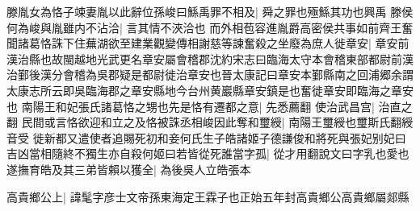 滕胤女為恪子竦妻胤以此辭位孫峻曰鯀禹罪不相及|{
	舜之罪也殛鯀其功也興禹}
滕侯何為峻與胤雖内不沾洽|{
	言其情不浹洽也}
而外相苞容進胤爵高密侯共事如前齊王奮聞諸葛恪誅下住蕪湖欲至建業觀變傳相謝慈等諫奮殺之坐廢為庶人徙章安|{
	章安前漢治縣也故閩越地光武更名章安屬會稽郡沈約宋志曰臨海太守本會稽東部都尉前漢治鄞後漢分會稽為吳郡疑是都尉徙治章安也晉太康記曰章安本鄞縣南之回浦郷余謂太康志所云即吳臨海郡之章安縣地今台州黄巖縣章安鎮是也奮徙章安即臨海之章安也}
南陽王和妃張氏諸葛恪之甥也先是恪有遷都之意|{
	先悉薦翻}
使治武昌宫|{
	治直之翻}
民間或言恪欲迎和立之及恪被誅丞相峻因此奪和璽綬|{
	南陽王璽綬也璽斯氏翻綬音受}
徙新都又遣使者追賜死初和妾何氏生子皓諸姬子德謙俊和將死與張妃别妃曰吉凶當相隨終不獨生亦自殺何姬曰若皆從死誰當字孤|{
	從才用翻說文曰字乳也愛也}
遂撫育皓及其三弟皆賴以獲全|{
	為後吳人立皓張本}


高貴鄉公上|{
	諱髦字彦士文帝孫東海定王霖子也正始五年封高貴鄉公高貴鄉屬郯縣}


